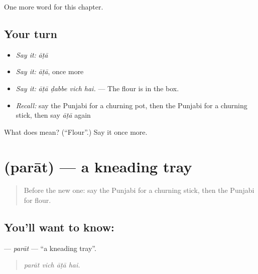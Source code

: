 \begin{grammarlens}[title={What you've built}]
One more word for this chapter.
\end{grammarlens}

\subsection*{Your turn}
\begin{itemize}
\raggedright
  \item \emph{Say it:} \emph{āṭā}
  \item \emph{Say it:} \emph{āṭā}, once more
  \item \emph{Say it:} \emph{āṭā ḍabbe vich hai.} — The flour is in the box.
  \item \emph{Recall:} say the Punjabi for a churning pot, then the Punjabi for a churning stick, then say \emph{āṭā} again
\end{itemize}

\begin{tcolorbox}[breakable,colback=teal!4,colframe=teal!35!black,title={Before you move on}]
What does  mean? (\textquotedblleft{}Flour\textquotedblright{}.) Say it once more.
\end{tcolorbox}
\section[\texorpdfstring{\pa{ਪਰਾਤ} (parāt)}{ਪਰਾਤ (parāt)}]{ (parāt) — a kneading tray}

\label{lesson:PA-C238-parat}



\begin{quote}
Before the new one: say the Punjabi for a churning stick, then the Punjabi for flour.
\end{quote}

\subsection*{You'll want to know: }
\textbf{} — \emph{parāt} — \textquotedblleft{}a kneading tray\textquotedblright{}.

\begin{quote}
   
\end{quote}

\begin{quote}
\emph{parāt vich āṭā hai.}
\end{quote}

